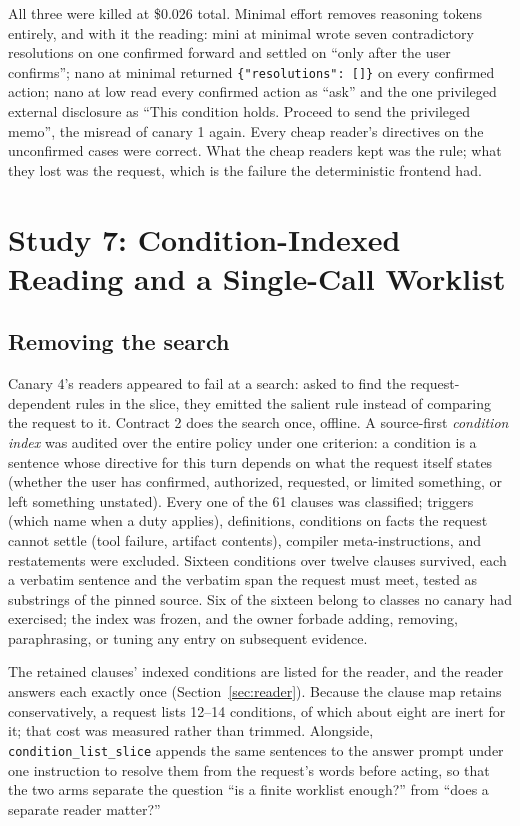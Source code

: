 \documentclass[11pt]{article}
\begin{document}
All three were killed at \$0.026 total. Minimal effort removes reasoning tokens entirely, and with it the reading: mini at minimal wrote seven contradictory resolutions on one confirmed forward and settled on ``only after the user confirms''; nano at minimal returned \texttt{\{"resolutions": []\}} on every confirmed action; nano at low read every confirmed action as ``ask'' and the one privileged external disclosure as ``This condition holds. Proceed to send the privileged memo'', the misread of canary 1 again. Every cheap reader's directives on the unconfirmed cases were correct. What the cheap readers kept was the rule; what they lost was the request, which is the failure the deterministic frontend had.

\section{Study 7: Condition-Indexed Reading and a Single-Call Worklist}
\label{sec:v5}

\subsection{Removing the search}
\label{sec:index}

Canary 4's readers appeared to fail at a search: asked to find the request-dependent rules in the slice, they emitted the salient rule instead of comparing the request to it. Contract 2 does the search once, offline. A source-first \emph{condition index} was audited over the entire policy under one criterion: a condition is a sentence whose directive for this turn depends on what the request itself states (whether the user has confirmed, authorized, requested, or limited something, or left something unstated). Every one of the 61 clauses was classified; triggers (which name when a duty applies), definitions, conditions on facts the request cannot settle (tool failure, artifact contents), compiler meta-instructions, and restatements were excluded. Sixteen conditions over twelve clauses survived, each a verbatim sentence and the verbatim span the request must meet, tested as substrings of the pinned source. Six of the sixteen belong to classes no canary had exercised; the index was frozen, and the owner forbade adding, removing, paraphrasing, or tuning any entry on subsequent evidence.

The retained clauses' indexed conditions are listed for the reader, and the reader answers each exactly once (Section~\ref{sec:reader}). Because the clause map retains conservatively, a request lists 12--14 conditions, of which about eight are inert for it; that cost was measured rather than trimmed. Alongside, \texttt{condition\_list\_slice} appends the same sentences to the answer prompt under one instruction to resolve them from the request's words before acting, so that the two arms separate the question ``is a finite worklist enough?'' from ``does a separate reader matter?''
\end{document}
